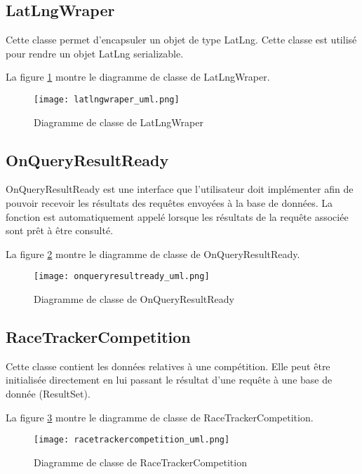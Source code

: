 
\subsection{LatLngWraper}

Cette classe permet d'encapsuler un objet de type LatLng. Cette classe est utilisé pour rendre un objet LatLng serializable.

La figure \ref{fig:latlngwraper_uml} montre le diagramme de classe de LatLngWraper.

\begin{figure}[htb]
\centering 
\texttt{[image: latlngwraper\_uml.png]} 
\caption{Diagramme de classe de LatLngWraper}
\label{fig:latlngwraper_uml}
 \end{figure}

\subsection{OnQueryResultReady}

OnQueryResultReady est une interface que l'utilisateur doit implémenter afin de pouvoir recevoir les résultats des requêtes envoyées à la base de données. La fonction est automatiquement appelé lorsque les résultats de la requête associée sont prêt à être consulté.

La figure \ref{fig:onqueryresultready_uml} montre le diagramme de classe de OnQueryResultReady.

\begin{figure}[htb]
\centering 
\texttt{[image: onqueryresultready\_uml.png]} 
\caption{Diagramme de classe de OnQueryResultReady}
\label{fig:onqueryresultready_uml}
 \end{figure}

\subsection{RaceTrackerCompetition}

Cette classe contient les données relatives à une compétition. Elle peut être initialisée directement en lui passant le résultat d'une requête à une base de donnée (ResultSet).

La figure \ref{fig:racetrackercompetition_uml} montre le diagramme de classe de RaceTrackerCompetition.

\begin{figure}[htb]
\centering 
\texttt{[image: racetrackercompetition\_uml.png]} 
\caption{Diagramme de classe de RaceTrackerCompetition}
\label{fig:racetrackercompetition_uml}
 \end{figure}


